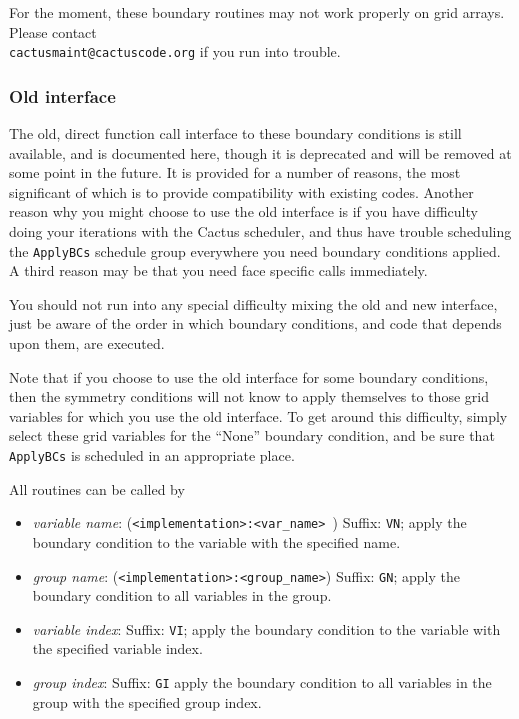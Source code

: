 \documentclass{article}
\begin{document}
For the moment, these boundary routines may not work properly on
grid arrays.  
Please contact\\ \texttt{cactusmaint@cactuscode.org} if
you run into trouble.

\subsubsection{Old interface}

The old, direct function call interface to these boundary conditions
is still available, and is documented here, though it is deprecated
and will be removed at some point in the future.  It is provided for a
number of reasons, the most significant of which is to provide
compatibility with existing codes.  Another reason why you might
choose to use the old interface is if you have difficulty doing your
iterations with the Cactus scheduler, and thus have trouble scheduling
the \texttt{ApplyBCs} schedule group everywhere you need boundary
conditions applied.  A third reason may be that you need face specific
calls immediately.

You should not run into any special difficulty mixing the old and new
interface, just be aware of the order in which boundary conditions, and
code that depends upon them, are executed.

Note that if you choose to use the old interface for some boundary
conditions, then the symmetry conditions will not know to apply
themselves to those grid variables for which you use the old
interface.  To get around this difficulty, simply select these grid
variables for the ``None'' boundary condition, and be sure that
\texttt{ApplyBCs} is scheduled in an appropriate place.

All routines can be called by
\begin{itemize}
\item{\em variable name}: ({\tt <implementation>:<var\_name> }) Suffix:
{\tt VN}; apply the boundary condition to the variable with the
specified name.
\item{\em group name}: ({\tt <implementation>:<group\_name>}) Suffix:
{\tt GN}; apply the boundary condition to all variables in the group.
\item{\em variable index}:  Suffix: {\tt VI}; apply the boundary
condition to the variable with the specified variable index.
\item{\em group index}:  Suffix: {\tt GI} apply the boundary
condition to all variables in the group with the specified group index.
\end{itemize}
\end{document}

